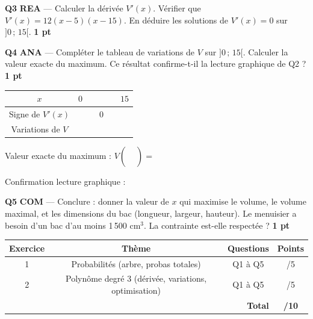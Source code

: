 \documentclass[a4paper,11pt]{article}
\newcommand{\pts}[1]{\hfill\textcolor{gris}{\small\textbf{#1}}}
\newcommand{\comp}[1]{\colorbox{blue!10}{\scriptsize\textbf{#1}}}
\begin{document}
\textbf{Q3} \comp{REA} — Calculer la dérivée $V'(x)$. Vérifier que $V'(x) = 12(x - 5)(x - 15)$. En déduire les solutions de $V'(x) = 0$ sur $]0\,;\,15[$. \pts{1 pt}

\begin{reponsebox}[3.5cm]
\dotfill

\dotfill

\dotfill

\dotfill
\end{reponsebox}

\textbf{Q4} \comp{ANA} — Compléter le tableau de variations de $V$ sur $]0\,;\,15[$. Calculer la valeur exacte du maximum. Ce résultat confirme-t-il la lecture graphique de Q2 ? \pts{1 pt}

\begin{center}
\renewcommand{\arraystretch}{2.2}
\begin{tabular}{|c|c|c|c|c|c|}
\hline
$x$ & $0$ & & \phantom{$\quad 5 \quad$} & & $15$ \\
\hline
Signe de $V'(x)$ & & \phantom{$++++$} & $0$ & \phantom{$----$} & \\
\hline
Variations de $V$ & \phantom{$0$} & & & & \phantom{$0$} \\[16pt]
\hline
\end{tabular}
\renewcommand{\arraystretch}{1}
\end{center}

\smallskip
Valeur exacte du maximum : $V\!\left(\phantom{\dfrac{10}{3}}\right) = $ \dotfill

\smallskip
Confirmation lecture graphique : \dotfill

\textbf{Q5} \comp{COM} — Conclure : donner la valeur de $x$ qui maximise le volume, le volume maximal, et les dimensions du bac (longueur, largeur, hauteur). Le menuisier a besoin d'un bac d'au moins 1\,500 cm$^3$. La contrainte est-elle respectée ? \pts{1 pt}

\begin{reponsebox}[4cm]
\dotfill

\dotfill

\dotfill

\dotfill

\dotfill
\end{reponsebox}

\vfill

\begin{center}
\begin{tabular}{|c|c|c|c|}
\hline
\textbf{Exercice} & \textbf{Thème} & \textbf{Questions} & \textbf{Points} \\
\hline
1 & Probabilités (arbre, probas totales) & Q1 à Q5 & /5 \\
\hline
2 & Polynôme degré 3 (dérivée, variations, optimisation) & Q1 à Q5 & /5 \\
\hline
\multicolumn{3}{|r|}{\textbf{Total}} & \textbf{/10} \\
\hline
\end{tabular}
\end{center}
\end{document}

